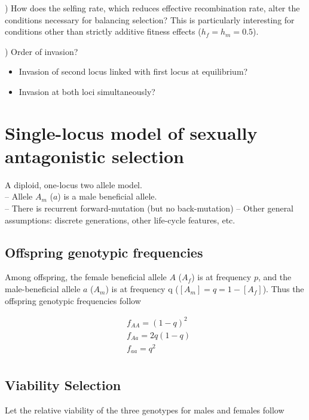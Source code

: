 \documentclass[11pt]{article}
\renewcommand\thesubsection{\arabic{subsection})}
\renewcommand\thesubsubsection{}
\begin{document}
) How does the selfing rate, which reduces effective recombination rate, alter the conditions necessary for balancing selection? This is particularly interesting for conditions other than strictly additive fitness effects ($h_f=h_m=0.5$). \bigskip

) Order of invasion? 
\begin{itemize}
  \item Invasion of second locus linked with first locus at equilibrium?
  \item Invasion at both loci simultaneously?
\end{itemize}

\newpage{}






\renewcommand\thesubsection{\arabic{subsection})}
\renewcommand\thesubsubsection{}
\setcounter{subsection}{0}  %
\section{Single-locus model of sexually antagonistic selection}

A diploid, one-locus two allele model. \\
-- Allele $A_m$ ($a$) is a male beneficial allele. \\
-- There is recurrent forward-mutation (but no back-mutation)
-- Other general assumptions: discrete generations, other life-cycle features, etc. \bigskip

\subsection{Offspring genotypic frequencies}
Among offspring, the female beneficial allele $A$ ($A_f$) is at frequency $p$, and the male-beneficial allele $a$ ($A_m$) is at frequency q ($[A_m] = q = 1 - [A_f]$). Thus the offspring genotypic frequencies follow 

\begin{align*}
&f_{AA} = (1-q)^{2} \\
&f_{Aa} = 2q(1-q) \\
&f_{aa} = q^{2} \\
\end{align*}


\subsection{Viability Selection}
Let the relative viability of the three genotypes for males and females follow
\end{document}
